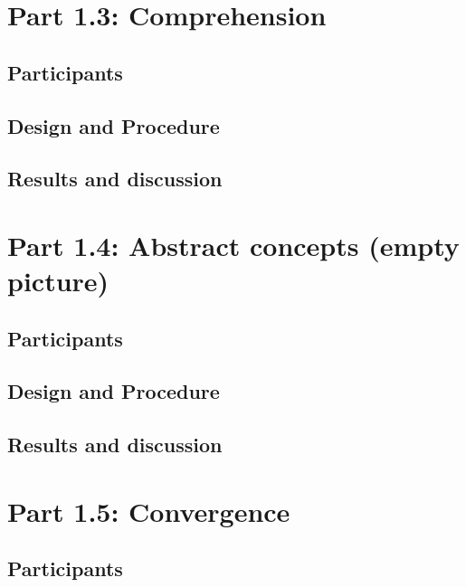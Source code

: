 \documentclass[man]{apa6}
\theoremstyle{definition}
\theoremstyle{definition}
\theoremstyle{definition}
\theoremstyle{remark}
\begin{document}
\section{Part 1.3: Comprehension}\label{part-1.3-comprehension}

\subsection{Participants}\label{participants-2}

\subsection{Design and Procedure}\label{design-and-procedure-2}

\subsection{Results and discussion}\label{results-and-discussion-2}

\section{Part 1.4: Abstract concepts (empty
picture)}\label{part-1.4-abstract-concepts-empty-picture}

\subsection{Participants}\label{participants-3}

\subsection{Design and Procedure}\label{design-and-procedure-3}

\subsection{Results and discussion}\label{results-and-discussion-3}

\section{Part 1.5: Convergence}\label{part-1.5-convergence}

\subsection{Participants}\label{participants-4}
\end{document}
